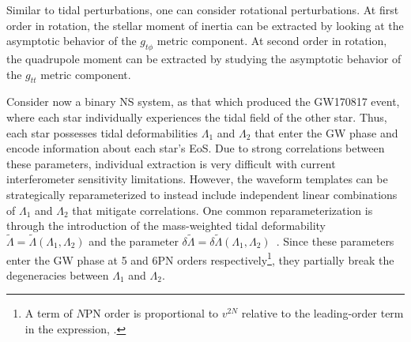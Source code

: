 \documentclass[prd,twocolumn,nofootinbib,superscriptaddress,amsmath,amssymb]{revtex4-1}
\begin{document}
Similar to tidal perturbations, one can consider rotational perturbations. At first order in rotation, the stellar moment of inertia can be extracted by looking at the asymptotic behavior of the $g_{t \phi}$ metric component. At second order in rotation, the quadrupole moment can be extracted by studying the asymptotic behavior of the $g_{t t}$ metric component. 

Consider now a binary NS system, as that which produced the GW170817 event, where each star individually experiences the tidal field of the other star.
Thus, each star possesses tidal deformabilities $\Lambda_1$ and $\Lambda_2$ that enter the GW phase and encode information about each star's EoS.
Due to strong correlations between these parameters, individual extraction is very difficult with current interferometer sensitivity limitations.
However, the waveform templates can be strategically reparameterized to instead include independent linear combinations of $\Lambda_1$ and $\Lambda_2$ that mitigate correlations. One common reparameterization is through the introduction of the mass-weighted tidal deformability $\tilde{\Lambda}=\tilde{\Lambda}(\Lambda_1,\Lambda_2)$ and the parameter $\delta \tilde{\Lambda}=\delta \tilde{\Lambda}(\Lambda_1,\Lambda_2)$~\cite{Favata:2013rwa,Wade:tidalCorrections}. Since these parameters enter the GW phase at 5 and 6PN orders respectively\footnote{A term of $N$PN order is proportional to $v^{2N}$ relative to the leading-order term in the expression, .}, they partially break the degeneracies between $\Lambda_{1}$ and $\Lambda_{2}$.
\end{document}

